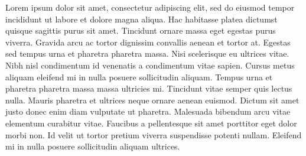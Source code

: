 

Lorem ipsum dolor sit amet, consectetur adipiscing elit, sed do eiusmod tempor incididunt ut labore et dolore magna aliqua.
Hac habitasse platea dictumst quisque sagittis purus sit amet.
Tincidunt ornare massa eget egestas purus viverra.
Gravida arcu ac tortor dignissim convallis aenean et tortor at.
Egestas sed tempus urna et pharetra pharetra massa.
Nisi scelerisque eu ultrices vitae.
Nibh nisl condimentum id venenatis a condimentum vitae sapien.
Cursus metus aliquam eleifend mi in nulla posuere sollicitudin aliquam.
Tempus urna et pharetra pharetra massa massa ultricies mi.
Tincidunt vitae semper quis lectus nulla.
Mauris pharetra et ultrices neque ornare aenean euismod.
Dictum sit amet justo donec enim diam vulputate ut pharetra.
Malesuada bibendum arcu vitae elementum curabitur vitae.
Faucibus a pellentesque sit amet porttitor eget dolor morbi non.
Id velit ut tortor pretium viverra suspendisse potenti nullam.
Eleifend mi in nulla posuere sollicitudin aliquam ultrices.